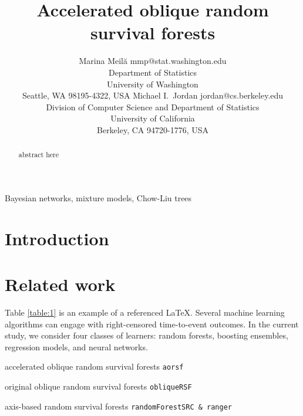 \documentclass[twoside,11pt]{article}\usepackage[]{graphicx}\usepackage[]{color}
\begin{document}
\title{Accelerated oblique random survival forests}

\author{\name Marina Meil\u{a} \email mmp@stat.washington.edu \\
       \addr Department of Statistics\\
       University of Washington\\
       Seattle, WA 98195-4322, USA
       \AND
       \name Michael I.\ Jordan \email jordan@cs.berkeley.edu \\
       \addr Division of Computer Science and Department of Statistics\\
       University of California\\
       Berkeley, CA 94720-1776, USA}


\maketitle




\begin{abstract}%
abstract here
\end{abstract}

\begin{keywords}
  Bayesian networks, mixture models, Chow-Liu trees
\end{keywords}

\section{Introduction}



\section{Related work}

Table \ref{table:1} is an example of a referenced \LaTeX{}. Several machine learning algorithms can engage with right-censored time-to-event outcomes. In the current study, we consider four classes of learners: random forests, boosting ensembles, regression models, and neural networks.

accelerated oblique random survival forests \texttt{aorsf}

original oblique random survival forests \texttt{obliqueRSF}

axis-based random survival forests \texttt{randomForestSRC \& ranger}
\end{document}

